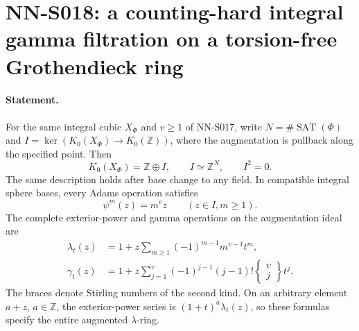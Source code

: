 \section{NN-S018: a counting-hard integral gamma filtration on a torsion-free Grothendieck ring}

\paragraph{Statement.}
For the same integral cubic $X_\Phi$ and $v\ge1$ of NN-S017, write
$N=\#\operatorname{SAT}(\Phi)$ and $I=\ker(K_0(X_\Phi)\to K_0(\mathbb Z))$,
where the augmentation is pullback along the specified point. Then
\begin{equation}\label{eq:S018-ring}
 K_0(X_\Phi)=\mathbb Z\oplus I,\qquad I\simeq\mathbb Z^N,\qquad I^2=0.
\end{equation}
The same description holds after base change to any field. In compatible
integral sphere bases, every Adams operation satisfies
\[
                  \psi^m(z)=m^v z\qquad (z\in I, m\ge1).
\]
The complete exterior-power and gamma operations on the augmentation
ideal are
\begin{align}
 \lambda_t(z)&=1+z\sum_{m\ge1}(-1)^{m-1}m^{v-1}t^m,
                                                    \label{eq:S018-lambda}\\
 \gamma_t(z)&=1+z\sum_{j=1}^{v}(-1)^{j-1}(j-1)!
                       \left\{\begin{matrix}v\\j\end{matrix}\right\}t^j.
                                                    \label{eq:S018-gamma}
\end{align}
The braces denote Stirling numbers of the second kind. On an arbitrary
element $a+z$, $a\in\mathbb Z$, the exterior-power series is
$(1+t)^a\lambda_t(z)$, so these formulas specify the entire augmented
$\lambda$-ring.

